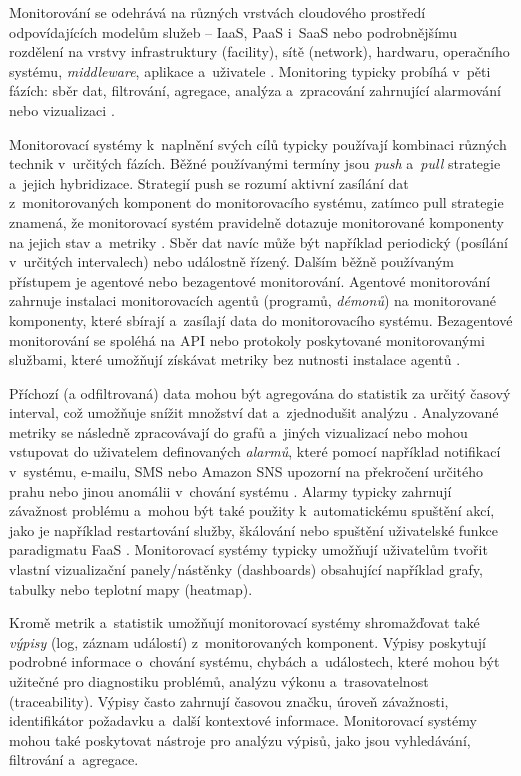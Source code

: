 \documentclass[czech, ing, kiv, he, iso690]{fasthesis}
\begin{document}
Monitorování se odehrává na různých vrstvách cloudového prostředí odpovídajících modelům služeb -- IaaS, PaaS i~SaaS \cite{cloud_mon_basics} nebo podrobnějšímu rozdělení na vrstvy infrastruktury (facility), sítě (network), hardwaru, operačního systému, \emph{middleware}, aplikace a~uživatele \cite{cloud_mon_aceto2}. Monitoring typicky probíhá v~pěti fázích: sběr dat, filtrování, agregace, analýza a~zpracování zahrnující alarmování nebo vizualizaci \cite{cloud_mon_basics}. 

Monitorovací systémy k~naplnění svých cílů typicky používají kombinaci různých technik v~určitých fázích. Běžné používanými termíny jsou \emph{push} a~\emph{pull} strategie a~jejich hybridizace. Strategií push se rozumí aktivní zasílání dat z~monitorovaných komponent do monitorovacího systému, zatímco pull strategie znamená, že monitorovací systém pravidelně dotazuje monitorované komponenty na jejich stav a~metriky \cite{cloud_mon_basics}. Sběr dat navíc může být například periodický (posílání v~určitých intervalech) nebo událostně řízený. Dalším běžně používaným přístupem je agentové nebo bezagentové monitorování. Agentové monitorování zahrnuje instalaci monitorovacích agentů (programů, \emph{démonů}) na monitorované komponenty, které sbírají a~zasílají data do monitorovacího systému. Bezagentové monitorování se spoléhá na API nebo protokoly poskytované monitorovanými službami, které umožňují získávat metriky bez nutnosti instalace agentů \cite{cloud_mon_basics}.

Příchozí (a odfiltrovaná) data mohou být agregována do statistik za určitý časový interval, což umožňuje snížit množství dat a~zjednodušit analýzu \cite{cloud_mon_basics, cloudwatch.docs.aws}. Analyzované metriky se následně zpracovávají do grafů a~jiných vizualizací nebo mohou vstupovat do uživatelem definovaných \emph{alarmů}, které pomocí například notifikací v~systému, e-mailu, SMS nebo Amazon SNS upozorní na překročení určitého prahu nebo jinou anomálii v~chování systému \cite{cloud_mon_basics, cloud_mon_aceto2}. Alarmy typicky zahrnují závažnost problému a~mohou být také použity k~automatickému spuštění akcí, jako je například restartování služby, škálování nebo spuštění uživatelské funkce paradigmatu FaaS \cite{cloud_mon_aceto2}. Monitorovací systémy typicky umožňují uživatelům tvořit vlastní vizualizační panely/nástěnky (dashboards) obsahující například grafy, tabulky nebo teplotní mapy (heatmap).

Kromě metrik a~statistik umožňují monitorovací systémy shromažďovat také \emph{výpisy} (log, záznam událostí) z~monitorovaných komponent. Výpisy poskytují podrobné informace o~chování systému, chybách a~událostech, které mohou být užitečné pro diagnostiku problémů, analýzu výkonu a~trasovatelnost (traceability). Výpisy často zahrnují časovou značku, úroveň závažnosti, identifikátor požadavku a~další kontextové informace. Monitorovací systémy mohou také poskytovat nástroje pro analýzu výpisů, jako jsou vyhledávání, filtrování a~agregace.
\end{document}
